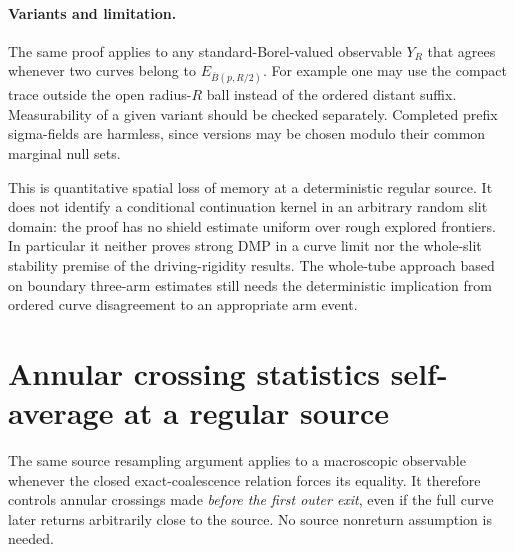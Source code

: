 \documentclass[11pt]{article}
\theoremstyle{definition}\newtheorem{definition}[theorem]{Definition}
\theoremstyle{remark}\newtheorem{remark}[theorem]{Remark}
\begin{document}
\paragraph{Variants and limitation.}
The same proof applies to any standard-Borel-valued observable $Y_R$
that agrees whenever two curves belong to $E_{\overline B(p,R/2)}$.
For example one may use the compact trace outside the open radius-$R$
ball instead of the ordered distant suffix. Measurability of a given
variant should be checked separately. Completed prefix sigma-fields
are harmless, since versions may be chosen modulo their common
marginal null sets.

This is quantitative spatial loss of memory at a deterministic regular
source. It does not identify a conditional continuation kernel in an
arbitrary random slit domain: the proof has no shield estimate uniform
over rough explored frontiers. In particular it neither proves strong
DMP in a curve limit nor the whole-slit stability premise of the
driving-rigidity results. The whole-tube approach based on boundary
three-arm estimates still needs the deterministic implication from
ordered curve disagreement to an appropriate arm event.


\section{Annular crossing statistics self-average at a regular source}
\label{sec:annular-scenery}

The same source resampling argument applies to a macroscopic observable
whenever the closed exact-coalescence relation forces its equality. It
therefore controls annular crossings made \emph{before the first outer
exit}, even if the full curve later returns arbitrarily close to the
source. No source nonreturn assumption is needed.
\end{document}
